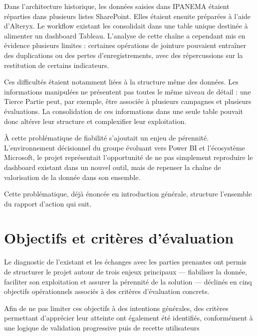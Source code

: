 Dans l'architecture historique, les données saisies dans IPANEMA étaient réparties 
dans plusieurs listes SharePoint. Elles étaient ensuite préparées à l'aide d'Alteryx. Le workflow 
existant les consolidait dans une table unique destinée à alimenter un dashboard Tableau. 
L'analyse de cette chaîne a cependant mis en évidence plusieurs limites : certaines opérations 
de jointure pouvaient entraîner des duplications ou des pertes d'enregistrements, avec des 
répercussions sur la restitution de certains indicateurs. 

Ces difficultés étaient notamment liées à la structure même des données. Les 
informations manipulées ne présentent pas toutes le même niveau de détail : une Tierce Partie 
peut, par exemple, être associée à plusieurs campagnes et plusieurs évaluations. La 
consolidation de ces informations dans une seule table pouvait donc altérer leur structure et 
complexifier leur exploitation.

À cette problématique de fiabilité s'ajoutait un enjeu de pérennité. L'environnement 
décisionnel du groupe évoluant vers Power BI et l'écosystème Microsoft, le projet représentait 
l'opportunité de ne pas simplement reproduire le dashboard existant dans un nouvel outil, mais 
de repenser la chaîne de valorisation de la donnée dans son ensemble.

Cette problématique, déjà énoncée en introduction générale, structure l'ensemble du 
rapport d'action qui suit. 

\section{Objectifs et critères d'évaluation}

\label{sec12}
Le diagnostic de l'existant et les échanges avec les parties prenantes ont permis de 
structurer le projet autour de trois enjeux principaux — fiabiliser la donnée, faciliter son 
exploitation et assurer la pérennité de la solution — déclinés en cinq objectifs opérationnels 
associés à des critères d'évaluation concrets. 

Afin de ne pas limiter ces objectifs à des intentions générales, des critères permettant d'apprécier leur atteinte ont également été identifiés, conformément à une logique de validation progressive puis de recette utilisateurs

